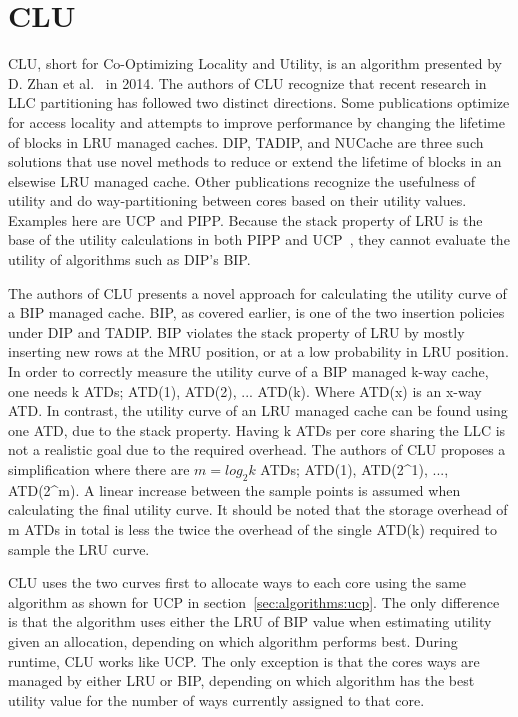 
\section{CLU}
\label{sec:algorithms:clu}

CLU, short for Co-Optimizing Locality and Utility, is an algorithm presented by D. Zhan et al.~\cite{Zhan2014} in 2014.
The authors of CLU recognize that recent research in LLC partitioning has followed two distinct directions.
Some publications optimize for access locality and attempts to improve performance by changing the lifetime of blocks in LRU managed caches.
DIP, TADIP, and NUCache are three such solutions that use novel methods to reduce or extend the lifetime of blocks in an elsewise LRU managed cache.
Other publications recognize the usefulness of utility and do way-partitioning between cores based on their utility values.
Examples here are UCP and PIPP.
Because the stack property of LRU is the base of the utility calculations in both PIPP and UCP~\cite{Qureshi2006, Xie2009}, they cannot evaluate the utility of algorithms such as DIP's BIP.

The authors of CLU presents a novel approach for calculating the utility curve of a BIP managed cache.
BIP, as covered earlier, is one of the two insertion policies under DIP and TADIP. 
BIP violates the stack property of LRU by mostly inserting new rows at the MRU position, or at a low probability in LRU position.
In order to correctly measure the utility curve of a BIP managed k-way cache, one needs k ATDs; ATD(1), ATD(2), ... ATD(k). 
Where ATD(x) is an x-way ATD.
In contrast, the utility curve of an LRU managed cache can be found using one ATD, due to the stack property.
Having k ATDs per core sharing the LLC is not a realistic goal due to the required overhead.
The authors of CLU proposes a simplification where there are $m = log_2 k$ ATDs; ATD(1), ATD(2^1), ..., ATD(2^m).
A linear increase between the sample points is assumed when calculating the final utility curve.
It should be noted that the storage overhead of m ATDs in total is less the twice the overhead of the single ATD(k) required to sample the LRU curve.

CLU uses the two curves first to allocate ways to each core using the same algorithm as shown for UCP in section~\ref{sec:algorithms:ucp}.
The only difference is that the algorithm uses either the LRU of BIP value when estimating utility given an allocation, depending on which algorithm performs best.
During runtime, CLU works like UCP.
The only exception is that the cores ways are managed by either LRU or BIP, depending on which algorithm has the best utility value for the number of ways currently assigned to that core.

